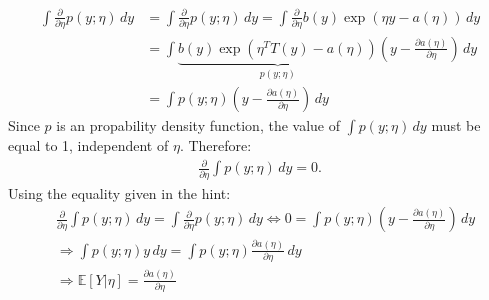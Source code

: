 \begin{answer}
\begin{align*}
    \int \frac{\partial}{\partial \eta} p(y;\eta) \,dy 
    &= \int \frac{\partial}{\partial \eta} p(y;\eta) \,dy
    = \int \frac{\partial}{\partial \eta} b(y)\exp(\eta y - a(\eta)) \,dy \\
    &= \int \underbrace{b(y) \exp(\eta^TT(y) - a(\eta))}_{p(y;\eta)} \left(y - \frac{\partial a(\eta)}{\partial\eta}\right) \,dy \\
    &=\int p(y;\eta) \left(y - \frac{\partial a(\eta)}{\partial\eta}\right) \,dy 
\end{align*}
Since $p$ is an propability density function, the value of $\int p(y;\eta) \,dy$ must be equal to 1, independent of $\eta$.
Therefore:
\begin{align*}
    \frac{\partial}{\partial \eta} \int p(y;\eta) \,dy  = 0.
\end{align*}
Using the equality given in the hint:
\begin{align*}
    &\frac{\partial}{\partial \eta} \int p(y;\eta) \,dy  =  \int\frac{\partial}{\partial \eta} p(y;\eta) \,dy 
    \Leftrightarrow 0 = \int p(y;\eta) \left(y - \frac{\partial a(\eta)}{\partial\eta}\right) \,dy  \\
    &\Rightarrow \int p(y;\eta) y \,dy = \int p(y;\eta) \frac{\partial a(\eta)}{\partial\eta} \,dy \\
    &\Rightarrow \mathbb{E}\left[Y|\eta\right] = \frac{\partial a(\eta)}{\partial\eta} 
\end{align*}
\end{answer}
